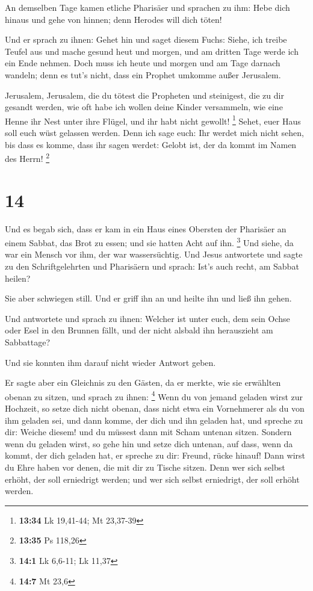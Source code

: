  An demselben Tage kamen etliche Pharisäer und sprachen
zu ihm: Hebe dich hinaus und gehe von hinnen; denn Herodes will dich
töten!

 Und er sprach zu ihnen: Gehet hin und saget diesem
Fuchs: Siehe, ich treibe Teufel aus und mache gesund heut und morgen,
und am dritten Tage werde ich ein Ende nehmen.  Doch muss
ich heute und morgen und am Tage darnach wandeln; denn es tut's nicht,
dass ein Prophet umkomme außer Jerusalem.

 Jerusalem, Jerusalem, die du tötest die Propheten und
steinigest, die zu dir gesandt werden, wie oft habe ich wollen deine
Kinder versammeln, wie eine Henne ihr Nest unter ihre Flügel, und ihr
habt nicht gewollt! \footnote{\textbf{13:34} Lk 19,41-44; Mt 23,37-39}
 Sehet, euer Haus soll euch wüst gelassen werden. Denn
ich sage euch: Ihr werdet mich nicht sehen, bis dass es komme, dass ihr
sagen werdet: Gelobt ist, der da kommt im Namen des Herrn! \footnote{\textbf{13:35}
  Ps 118,26}

\hypertarget{section-5}{%
\section{14}\label{section-5}}

 Und es begab sich, dass er kam in ein Haus eines Obersten
der Pharisäer an einem Sabbat, das Brot zu essen; und sie hatten Acht
auf ihn. \footnote{\textbf{14:1} Lk 6,6-11; Lk 11,37}  Und
siehe, da war ein Mensch vor ihm, der war wassersüchtig. 
Und Jesus antwortete und sagte zu den Schriftgelehrten und Pharisäern
und sprach: Ist's auch recht, am Sabbat heilen?

 Sie aber schwiegen still. Und er griff ihn an und heilte
ihn und ließ ihn gehen.

 Und antwortete und sprach zu ihnen: Welcher ist unter
euch, dem sein Ochse oder Esel in den Brunnen fällt, und der nicht
alsbald ihn herauszieht am Sabbattage?

 Und sie konnten ihm darauf nicht wieder Antwort geben.

 Er sagte aber ein Gleichnis zu den Gästen, da er merkte,
wie sie erwählten obenan zu sitzen, und sprach zu ihnen: \footnote{\textbf{14:7}
  Mt 23,6}  Wenn du von jemand geladen wirst zur Hochzeit,
so setze dich nicht obenan, dass nicht etwa ein Vornehmerer als du von
ihm geladen sei,  und dann komme, der dich und ihn geladen
hat, und spreche zu dir: Weiche diesem! und du müssest dann mit Scham
untenan sitzen.  Sondern wenn du geladen wirst, so gehe
hin und setze dich untenan, auf dass, wenn da kommt, der dich geladen
hat, er spreche zu dir: Freund, rücke hinauf! Dann wirst du Ehre haben
vor denen, die mit dir zu Tische sitzen.  Denn wer sich
selbst erhöht, der soll erniedrigt werden; und wer sich selbst
erniedrigt, der soll erhöht werden.

